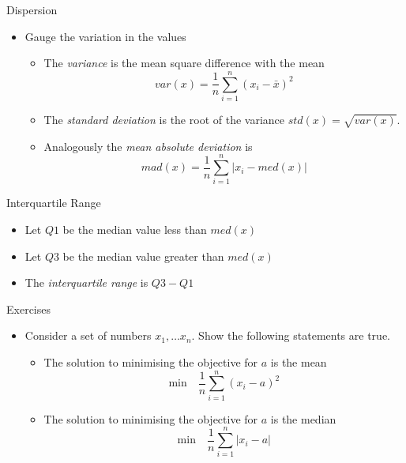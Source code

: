 \documentclass{beamer}
\begin{document}
\begin{frame}{Dispersion}  
\begin{itemize} 
 \item Gauge the variation in the values 
\begin{itemize} 
\item The \emph{variance} is the mean square difference with the mean 
\begin{displaymath} 
 var(x) = \frac{1}{n}\sum_{i=1}^n (x_i - \bar{x})^2
\end{displaymath}
 \item The \emph{standard deviation} is the root of the variance $std(x) = \sqrt{var(x)}$. 
\item Analogously the \emph{mean absolute deviation} is 
\begin{displaymath} 
  mad(x) = \frac{1}{n}\sum_{i=1}^n |x_i - med(x)|
\end{displaymath}
\end{itemize}
\end{itemize}
\end{frame}

\begin{frame}{Interquartile Range} 
 \begin{itemize} 
  \item Let $Q1$ be the median value less than $med(x)$ 
  \item Let $Q3$ be the median value greater than $med(x)$
  \item The \emph{interquartile range} is $Q3 - Q1$ 
 \end{itemize}
\end{frame}

\begin{frame}{Exercises}  
\begin{itemize} 
 \item Consider a set of numbers $x_1, \ldots x_n$. Show the following statements are true. 
\begin{itemize} 
\item The solution to minimising the objective for $a$ is the mean 
\begin{displaymath} 
 \mbox{min} \quad  \frac{1}{n}\sum_{i=1}^n (x_i - a)^2
\end{displaymath}
\item The solution to minimising the objective for $a$ is the median 
\begin{displaymath} 
 \mbox{min} \quad  \frac{1}{n}\sum_{i=1}^n |x_i - a|
\end{displaymath}
\end{itemize}
 \end{itemize}
\end{frame}
\end{document}
